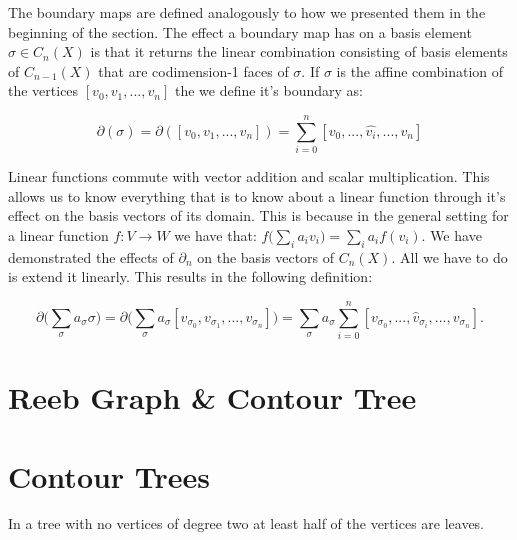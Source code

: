 The boundary maps are defined analogously to how we presented them in the beginning of the section. The effect a boundary map has on a basis element $\sigma \in C_n(X)$ is that it returns the linear combination consisting of basis elements of $C_{n-1}(X)$ that are codimension-1 faces of $\sigma$. If $\sigma$ is the affine combination of the vertices $[v_0, v_1, ..., v_n]$ the we define it's boundary as:

$$ \partial(\sigma) = \partial([v_0, v_1, ..., v_n]) = \sum_{i=0}^{n}[v_0, ... , \hat{v_i}, ..., v_n] $$

Linear functions commute with vector addition and scalar multiplication. This allows us to know everything that is to know about a linear function through it's effect on the basis vectors of its domain. This is because in the general setting for a linear function $f : V \to W$ we have that: $ f\big(\sum_{i}{a_iv_i}\big) = \sum_i{a_if(v_i)} $. We have demonstrated the effects of $\partial_n$ on the basis vectors of $C_n(X)$. All we have to do is extend it linearly. This results in the following definition:


$$ \partial\bigg(\sum_{\sigma}a_{\sigma}\sigma\bigg) = \partial\bigg(\sum_{\sigma}{a_{\sigma}[v_{\sigma_0}, v_{\sigma_1}, ..., v_{\sigma_n}]}\bigg) = \sum_{\sigma}{a_{\sigma} \sum_{i=0}^{n}[v_{\sigma_0},..., \hat{v}_{\sigma_i}, ..., v_{\sigma_n}]} .$$


\section{Reeb Graph \& Contour Tree}


\section{Contour Trees}

\begin{lem} In a tree with no vertices of degree two at least half of the vertices are leaves. \end{lem}

